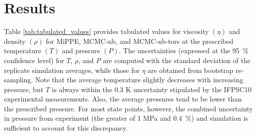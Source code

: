 \documentclass[preprint,review,12pt]{elsarticle}
\begin{document}
		
	\section{Results} \label{Results}    
	
	Table \ref{tab:tabulated_values} provides tabulated values for viscosity $(\eta)$ and density $(\rho)$ for MiPPE, MCMC-nb, and MCMC-nb-tors at the prescribed temperature $(T)$ and pressure $(P)$. The uncertainties (expressed at the 95~\% confidence level) for $T$, $\rho$, and $P$ are computed with the standard deviation of the replicate simulation averages, while those for $\eta$ are obtained from bootstrap re-sampling. Note that the average temperature slightly decreases with increasing pressure, but $T$ is always within the 0.3 K uncertainty stipulated by the IFPSC10 experimental measurements. Also, the average pressures tend to be lower than the prescribed pressure. For most state points, however, the combined uncertainty in pressure from experiment (the greater of 1 MPa and 0.4~\%) and simulation is sufficient to account for this discrepancy. 
	
	
\end{document}
